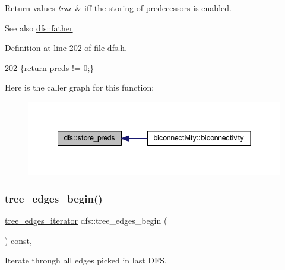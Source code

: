 \begin{DoxyRetVals}{Return values}
{\em true} & iff the storing of predecessors is enabled. \\
\hline
\end{DoxyRetVals}
\begin{DoxySeeAlso}{See also}
\mbox{\hyperlink{classdfs_a3012717ce541b3e56943e2c2c50efdf6}{dfs\+::father}} 
\end{DoxySeeAlso}


Definition at line 202 of file dfs.\+h.


\begin{DoxyCode}
202 \{\textcolor{keywordflow}{return} \mbox{\hyperlink{classdfs_a3fdeb5a211a1bc1753b2a637258c5355}{preds}} != 0;\}
\end{DoxyCode}
Here is the caller graph for this function\+:
\nopagebreak
\begin{figure}[H]
\begin{center}
\leavevmode
\includegraphics[width=342pt]{classdfs_ad0233128f2958d630102096aa6f3b9ef_icgraph}
\end{center}
\end{figure}
\mbox{\label{classdfs_afe193938a05b114870c19163731273c8}} 
\subsubsection{\texorpdfstring{tree\+\_\+edges\+\_\+begin()}{tree\_edges\_begin()}}
{\footnotesize\ttfamily \mbox{\hyperlink{classdfs_accde8d5403404f6d22fe4756d4ffedd5}{tree\+\_\+edges\+\_\+iterator}} dfs\+::tree\+\_\+edges\+\_\+begin (\begin{DoxyParamCaption}{ }\end{DoxyParamCaption}) const\hspace{0.3cm}{\ttfamily [inline]}, {\ttfamily [inherited]}}



Iterate through all edges picked in last D\+FS. 

